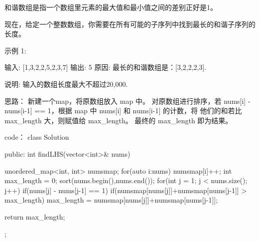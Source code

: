 和谐数组是指一个数组里元素的最大值和最小值之间的差别正好是1。

现在，给定一个整数数组，你需要在所有可能的子序列中找到最长的和谐子序列的长度。

示例 1:

输入: [1,3,2,2,5,2,3,7]
输出: 5
原因: 最长的和谐数组是：[3,2,2,2,3].

说明: 输入的数组长度最大不超过20,000.





























思路：
新建一个map，将原数组放入 map 中。
对原数组进行排序，若 nums[i] - nums[i-1] == 1，根据 map 中 nums[i] 和 nums[i-1] 的计数，将 他们的和若比 max_length 大，则赋值给 max_length。
最终的 max_length 即为结果。




























code：
class Solution {
public:
    int findLHS(vector<int>& nums) {
        unordered_map<int, int> numsmap;
        for(auto i:nums)
            numsmap[i]++;
        int max_length = 0;
        sort(nums.begin(),nums.end());
        for(int j = 1; j < nums.size(); j++)
        {
            if(nums[j] - nums[j-1] == 1)
            {
                if(numsmap[nums[j]]+numsmap[nums[j-1]] > max_length)
                    max_length = numsmap[nums[j]]+numsmap[nums[j-1]];
            }
        }
        
        return max_length;
    }
};